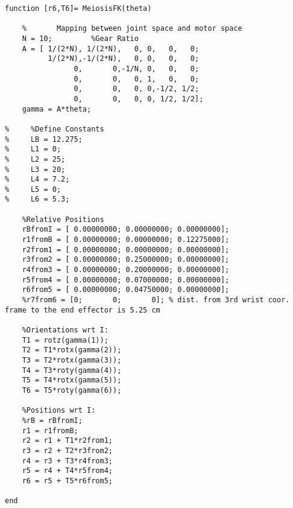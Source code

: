 \begin{lstlisting}[frame=lines,style=Matlab-editor,basicstyle = \mlttfamily, caption=Forward Kinematics MATLAB Function]
function [r6,T6]= MeiosisFK(theta)

    %       Mapping between joint space and motor space
    N = 10;         %Gear Ratio
    A = [ 1/(2*N), 1/(2*N),   0, 0,   0,   0;
          1/(2*N),-1/(2*N),   0, 0,   0,   0;
                0,       0,-1/N, 0,   0,   0;
                0,       0,   0, 1,   0,   0;
                0,       0,   0, 0,-1/2, 1/2;
                0,       0,   0, 0, 1/2, 1/2];
    gamma = A*theta;

%     %Define Constants
%     LB = 12.275;
%     L1 = 0;
%     L2 = 25;
%     L3 = 20;
%     L4 = 7.2;
%     L5 = 0;
%     L6 = 5.3;

    %Relative Positions
    rBfromI = [ 0.00000000; 0.00000000; 0.00000000];
    r1fromB = [ 0.00000000; 0.00000000; 0.12275000];
    r2from1 = [ 0.00000000; 0.00000000; 0.00000000];
    r3from2 = [ 0.00000000; 0.25000000; 0.00000000];
    r4from3 = [ 0.00000000; 0.20000000; 0.00000000];
    r5from4 = [ 0.00000000; 0.07000000; 0.00000000];
    r6from5 = [ 0.00000000; 0.04750000; 0.00000000];
    %r7from6 = [0;       0;       0]; % dist. from 3rd wrist coor. frame to the end effector is 5.25 cm

    %Orientations wrt I:
    T1 = rotz(gamma(1));
    T2 = T1*rotx(gamma(2));
    T3 = T2*rotx(gamma(3));
    T4 = T3*roty(gamma(4));
    T5 = T4*rotx(gamma(5));
    T6 = T5*roty(gamma(6));

    %Positions wrt I:
    %rB = rBfromI;
    r1 = r1fromB;
    r2 = r1 + T1*r2from1;
    r3 = r2 + T2*r3from2;
    r4 = r3 + T3*r4from3;
    r5 = r4 + T4*r5from4;
    r6 = r5 + T5*r6from5;

end
\end{lstlisting}
